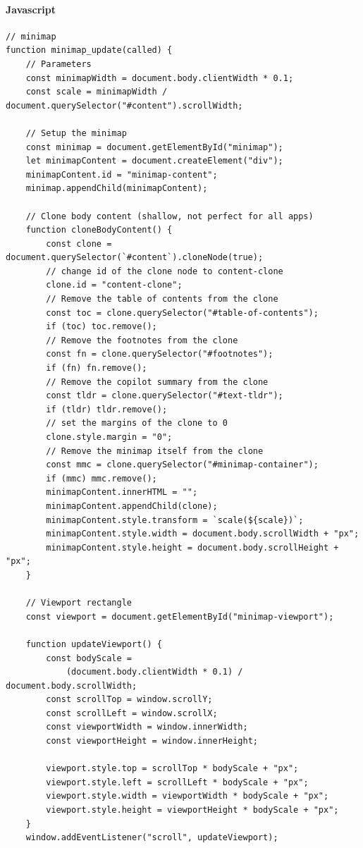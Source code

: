 \documentclass[11pt]{article}
\begin{document}
\paragraph{Javascript}
\label{sec:orgd5190e7}
\begin{verbatim}
// minimap
function minimap_update(called) {
    // Parameters
    const minimapWidth = document.body.clientWidth * 0.1;
    const scale = minimapWidth / document.querySelector("#content").scrollWidth;

    // Setup the minimap
    const minimap = document.getElementById("minimap");
    let minimapContent = document.createElement("div");
    minimapContent.id = "minimap-content";
    minimap.appendChild(minimapContent);

    // Clone body content (shallow, not perfect for all apps)
    function cloneBodyContent() {
        const clone = document.querySelector(`#content`).cloneNode(true);
        // change id of the clone node to content-clone
        clone.id = "content-clone";
        // Remove the table of contents from the clone
        const toc = clone.querySelector("#table-of-contents");
        if (toc) toc.remove();
        // Remove the footnotes from the clone
        const fn = clone.querySelector("#footnotes");
        if (fn) fn.remove();
        // Remove the copilot summary from the clone
        const tldr = clone.querySelector("#text-tldr");
        if (tldr) tldr.remove();
        // set the margins of the clone to 0
        clone.style.margin = "0";
        // Remove the minimap itself from the clone
        const mmc = clone.querySelector("#minimap-container");
        if (mmc) mmc.remove();
        minimapContent.innerHTML = "";
        minimapContent.appendChild(clone);
        minimapContent.style.transform = `scale(${scale})`;
        minimapContent.style.width = document.body.scrollWidth + "px";
        minimapContent.style.height = document.body.scrollHeight + "px";
    }

    // Viewport rectangle
    const viewport = document.getElementById("minimap-viewport");

    function updateViewport() {
        const bodyScale =
            (document.body.clientWidth * 0.1) / document.body.scrollWidth;
        const scrollTop = window.scrollY;
        const scrollLeft = window.scrollX;
        const viewportWidth = window.innerWidth;
        const viewportHeight = window.innerHeight;

        viewport.style.top = scrollTop * bodyScale + "px";
        viewport.style.left = scrollLeft * bodyScale + "px";
        viewport.style.width = viewportWidth * bodyScale + "px";
        viewport.style.height = viewportHeight * bodyScale + "px";
    }
    window.addEventListener("scroll", updateViewport);


\end{verbatim}
\end{document}
